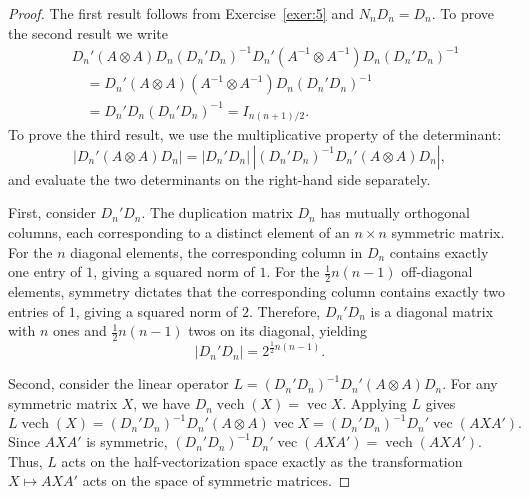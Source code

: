 \documentclass[14pt]{extarticle}
\theoremstyle{plain}
\theoremstyle{definition}
\theoremstyle{remark}
\DeclareMathOperator{\vech}{vech}
\DeclareMathOperator{\avec}{vec}
\begin{document}
\begin{proof}
The first result follows from Exercise~\ref{exer:5} and $N_n D_n = D_n$. To prove the second result we write
\begin{align*}
&D_n'(A \otimes A)D_n (D_n'D_n)^{-1} D_n'(A^{-1} \otimes A^{-1})D_n(D_n'D_n)^{-1} \\
&\quad= D_n'(A \otimes A)(A^{-1} \otimes A^{-1})D_n(D_n'D_n)^{-1} \\
&\quad= D_n'D_n(D_n'D_n)^{-1} = I_{n(n+1)/2}.
\end{align*}
To prove the third result, we use the multiplicative property of the determinant:
\[
|D_n'(A \otimes A)D_n| = |D_n'D_n| \, |(D_n'D_n)^{-1} D_n'(A \otimes A)D_n|,
\]
and evaluate the two determinants on the right-hand side separately.

First, consider $D_n'D_n$. The duplication matrix $D_n$ has mutually orthogonal columns, each corresponding to a distinct element of an $n \times n$ symmetric matrix. For the $n$ diagonal elements, the corresponding column in $D_n$ contains exactly one entry of $1$, giving a squared norm of $1$. For the $\frac{1}{2}n(n-1)$ off-diagonal elements, symmetry dictates that the corresponding column contains exactly two entries of $1$, giving a squared norm of $2$. Therefore, $D_n'D_n$ is a diagonal matrix with $n$ ones and $\frac{1}{2}n(n-1)$ twos on its diagonal, yielding
\[
|D_n'D_n| = 2^{\frac{1}{2}n(n-1)}.
\]

Second, consider the linear operator $L = (D_n'D_n)^{-1}D_n'(A \otimes A)D_n$. For any symmetric matrix $X$, we have $D_n \vech(X) = \avec X$. Applying $L$ gives
\[
L \vech(X) = (D_n'D_n)^{-1}D_n'(A \otimes A)\avec X = (D_n'D_n)^{-1}D_n'\avec(AXA').
\]
Since $AXA'$ is symmetric, $(D_n'D_n)^{-1}D_n'\avec(AXA') = \vech(AXA')$. Thus, $L$ acts on the half-vectorization space exactly as the transformation $X \mapsto AXA'$ acts on the space of symmetric matrices.


\end{proof}
\end{document}
